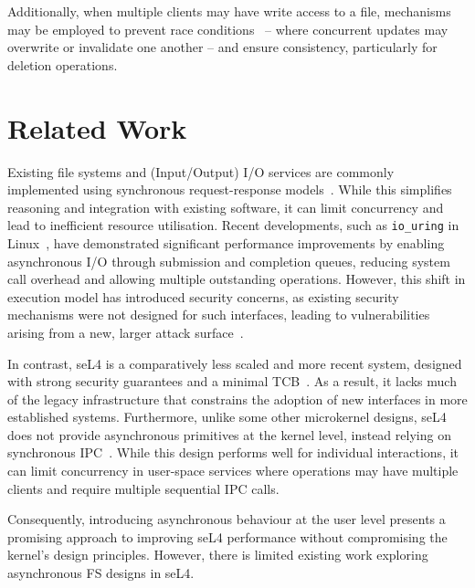 Additionally, when multiple clients may have write access to a file, mechanisms may be employed to prevent race conditions~\cite{lhee2005detection} -- where concurrent updates may overwrite or invalidate one another -- and ensure consistency, particularly for deletion operations.

\newpage
\section{Related Work}

Existing file systems and (Input/Output) I/O services are commonly implemented using synchronous request-response models~\cite{silberschatz2013operating}. While this simplifies reasoning and integration with existing software, it can limit concurrency and lead to inefficient resource utilisation. Recent developments, such as \texttt{io\_uring} in Linux~\cite{didona_understanding_2022}, have demonstrated significant performance improvements by enabling asynchronous I/O through submission and completion queues, reducing system call overhead and allowing multiple outstanding operations. However, this shift in execution model has introduced security concerns, as existing security mechanisms were not designed for such interfaces, leading to vulnerabilities arising from a new, larger attack surface~\cite{he_ringguard_2023}.

In contrast, seL4 is a comparatively less scaled and more recent system, designed with strong security guarantees and a minimal TCB~\cite{klein_sel4_2009}. As a result, it lacks much of the legacy infrastructure that constrains the adoption of new interfaces in more established systems. Furthermore, unlike some other microkernel designs, seL4 does not provide asynchronous primitives at the kernel level, instead relying on synchronous IPC~\cite{liedtke_improving_1993}. While this design performs well for individual interactions, it can limit concurrency in user-space services where operations may have multiple clients and require multiple sequential IPC calls.

Consequently, introducing asynchronous behaviour at the user level presents a promising approach to improving seL4 performance without compromising the kernel’s design principles. However, there is limited existing work exploring asynchronous FS designs in seL4.

